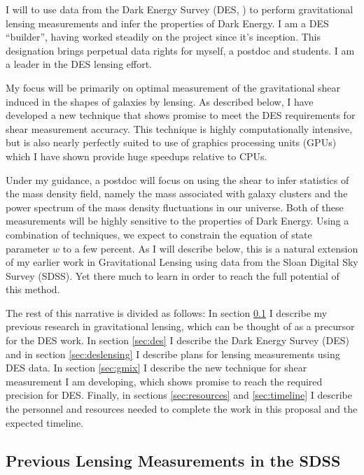 \documentclass[12pt]{article}
\begin{document}
I will to use data from the Dark Energy Survey (DES, \cite{DESWhitePaper}) to
perform gravitational lensing measurements and infer the properties of Dark
Energy.  I am a DES ``builder'', having worked steadily on the project since
it's inception.  This designation brings perpetual data rights for myself, a
postdoc and students.  I am a leader in the DES lensing effort.  

My focus will be primarily on optimal measurement of the gravitational shear
induced in the shapes of galaxies by lensing. As described below, I have
developed a new technique that shows promise to meet the DES requirements for
shear measurement accuracy.  This technique is highly computationally
intensive, but is also nearly perfectly suited to use of graphics processing
units (GPUs) which I have shown provide huge speedups relative to CPUs.

Under my guidance, a postdoc will focus on using the shear to infer statistics
of the mass density field, namely the mass associated with galaxy clusters and
the power spectrum of the mass density fluctuations in our universe. Both of
these measurements will be highly sensitive to the properties of Dark Energy.
Using a combination of techniques, we expect to constrain the equation of state
parameter $w$ to a few percent.  As I will describe below, this is a natural
extension of my earlier work in Gravitational Lensing using data from the Sloan
Digital Sky Survey (SDSS).  Yet there much to learn in order to reach the full 
potential of this method.

The rest of this narrative is divided as follows: In section \ref{sec:sdssold}
I describe my previous research in gravitational lensing, which can be thought
of as a precursor for the DES work.  In section \ref{sec:des} I describe the
Dark Energy Survey (DES) and in section \ref{sec:deslensing} I describe plans
for lensing measurements using DES data.  In section \ref{sec:gmix} I describe
the new technique for shear measurement I am developing, which shows promise to
reach the required precision for DES. 
Finally, in sections \ref{sec:resources} and \ref{sec:timeline} I describe the
personnel and resources needed to complete the work in this proposal and the
expected timeline.


\subsection{Previous Lensing Measurements in the SDSS} \label{sec:sdssold}
\end{document}

